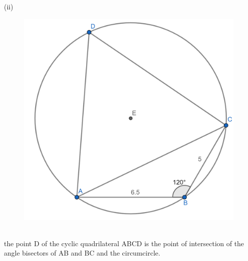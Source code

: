 \documentclass[12pt]{article}
\begin{document}
\pagebreak
(ii)
\begin{figure}[!h]
\begin{center}
\includegraphics[scale=0.6]{fig2.png}\\
\end{center}
\end{figure}
\\
the point D of the cyclic quadrilateral ABCD is the point of intersection of the angle 
bisectors of AB and BC and the circumcircle.
\end{document}

